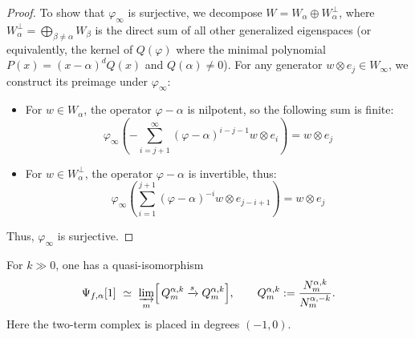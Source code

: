 \begin{proof}
    To show that $\varphi_{\infty}$ is surjective, we decompose $W = W_{\alpha} \oplus W_{\alpha}^{\perp}$, where $W_{\alpha}^{\perp} = \bigoplus_{\beta \neq \alpha} W_{\beta}$ is the direct sum of all other generalized eigenspaces (or equivalently, the kernel of $Q(\varphi)$ where the minimal polynomial $P(x) = (x-\alpha)^d Q(x)$ and $Q(\alpha) \neq 0$).
    For any generator $w \otimes e_j \in W_\infty$, we construct its preimage under $\varphi_{\infty}$:

    \begin{itemize}
        \item For $w \in W_{\alpha}$, the operator $\varphi - \alpha$ is nilpotent, so the following sum is finite:
              \begin{equation*}
                  \varphi_{\infty}\left( -\sum\limits_{i=j+1}^{\infty} (\varphi-\alpha)^{i-j-1}w\otimes e_{i} \right) = w\otimes e_{j}
              \end{equation*}

        \item For $w \in W_{\alpha}^{\perp}$, the operator $\varphi - \alpha$ is invertible, thus:
              \begin{equation*}
                  \varphi_{\infty}\left( \sum\limits_{i=1}^{j+1}(\varphi-\alpha)^{-i}w\otimes e_{j-i+1} \right) = w\otimes e_{j}
              \end{equation*}
    \end{itemize}
    Thus, $\varphi_{\infty}$ is surjective.
\end{proof}

\begin{corollary}\label{cor:colimit_of_quotients_calculates_nearby_cycles}
    For $k\gg 0$, one has a quasi-isomorphism
    \[
        \Psi_{f,\alpha}[1]\ \simeq\ \varinjlim_{m}\Bigl[\,
        Q_m^{\alpha,k}\xrightarrow{s}Q_m^{\alpha,k}\Bigr],
        \qquad
        Q_m^{\alpha,k}:=\frac{N_m^{\alpha,k}}{N_m^{\alpha,-k}}.
    \]
    Here the two-term complex is placed in degrees $(-1,0)$.
\end{corollary}

